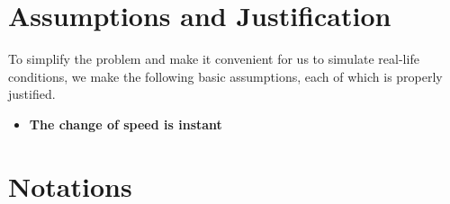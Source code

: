 \documentclass[12pt]{article}
\begin{document}
\section{Assumptions and Justification}

To simplify the problem and make it convenient for us to simulate real-life conditions, we make the following basic assumptions, each of which is properly justified.

\begin{itemize}
    \item {\bf The change of speed is instant}

\end{itemize}
\section{Notations}
\end{document}
